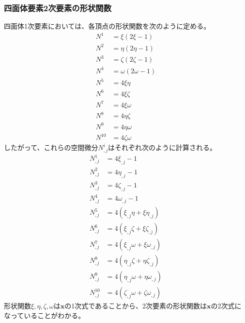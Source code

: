 \documentclass{jarticle}
\begin{document}
\subsubsection{四面体要素2次要素の形状関数}
四面体1次要素においては、各頂点の形状関数を次のように定める。
\begin{align}
  N^1 &= \xi(2\xi-1)\\
  N^2 &= \eta(2\eta-1)\\
  N^3 &= \zeta(2\zeta-1)\\
  N^4 &= \omega(2\omega-1)\\
  N^5 &= 4\xi\eta\\
  N^6 &= 4\xi\zeta\\
  N^7 &= 4\xi\omega\\
  N^8 &= 4\eta\zeta\\
  N^9 &= 4\eta\omega\\
  N^{10} &= 4\zeta\omega
\end{align}
したがって、これらの空間微分$N^i_{, j}$はそれぞれ次のように計算される。
\begin{align}
  N^1_{,j} &= 4\xi_{,j}-1\\
  N^2_{,j} &= 4\eta_{,j}-1\\
  N^3_{,j} &= 4\zeta_{,j}-1\\
  N^4_{,j} &= 4\omega_{,j}-1\\
  N^5_{,j} &= 4(\xi_{,j}\eta+\xi\eta_{,j})\\
  N^6_{,j} &= 4(\xi_{,j}\zeta+\xi\zeta_{,j})\\
  N^7_{,j} &= 4(\xi_{,j}\omega+\xi\omega_{,j})\\
  N^8_{,j} &= 4(\eta_{,j}\zeta+\eta\zeta_{,j})\\
  N^9_{,j} &= 4(\eta_{,j}\omega+\eta\omega_{,j})\\
  N^{10}_{,j} &= 4(\zeta_{,j}\omega+\zeta\omega_{,j})
\end{align}
形状関数$\xi,\eta,\zeta,\omega$は$\bm{x}$の1次式であることから、2次要素の形状関数は$\bm{x}$の2次式になっていることがわかる。
\end{document}
